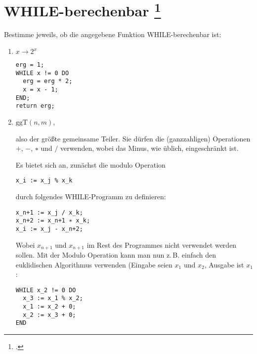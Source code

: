 \documentclass{lehramt-informatik-aufgabe}
\begin{document}
\section{WHILE-berechenbar
\footcite[Aufgabe 2]{theo:ab:4}}

Bestimme jeweils, ob die angegebene Funktion WHILE-berechenbar ist:

\begin{enumerate}


\item $x \rightarrow 2^x$

\begin{liAntwort}
\begin{verbatim}
erg = 1;
WHILE x != 0 DO
  erg = erg * 2;
  x = x - 1;
END;
return erg;
\end{verbatim}
\end{liAntwort}


\item $\text{ggT}(n, m)$,

also der größte gemeinsame Teiler. Sie dürfen die (ganzzahligen)
Operationen $+$, $−$, $∗$ und $/$ verwenden, wobei das Minus, wie
üblich, eingeschränkt ist.

\begin{liAntwort}
Es bietet sich an, zunächst die modulo Operation

\begin{verbatim}
x_i := x_j % x_k
\end{verbatim}

durch folgendes WHILE-Programm zu definieren:

\begin{verbatim}
x_n+1 := x_j / x_k;
x_n+2 := x_n+1 ∗ x_k;
x_i := x_j - x_n+2;
\end{verbatim}

Wobei $x_{n+1}$ und $x_{n+1}$ im Rest des Programmes nicht verwendet
werden sollen. Mit der Modulo Operation kann man nun z.\,B. einfach den
euklidischen Algorithmus verwenden (Eingabe seien $x_1$ und $x_2$,
Ausgabe ist $x_1$:

\begin{verbatim}
WHILE x_2 != 0 DO
  x_3 := x_1 % x_2;
  x_1 := x_2 + 0;
  x_2 := x_3 + 0;
END
\end{verbatim}
\end{liAntwort}



\end{enumerate}
\end{document}
